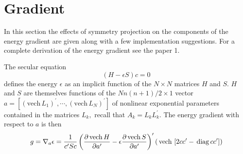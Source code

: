 \documentclass[12pt,thmsa]{article}
\begin{document}
\section{Gradient}

In this section the effects of symmetry projection on the components of the
energy gradient are given along with a few implementation suggestions. For a
complete derivation of the energy gradient see the paper 1.

The secular equation 
\begin{equation}
\left( H-\epsilon S\right) c=0
\end{equation}
defines the energy $\epsilon $ as an implicit function of the $N\times N$
matrices $H$ and $S$. $H$ and $S$ are themselves functions of the $Nn\left(
n+1\right) /2\times 1$ vector $a=\left[ \left( \mathrm{vech}\,L_1\right)
^{\prime },\cdots ,\left( \mathrm{vech}\,L_N\right) ^{\prime }\right] $ of
nonlinear exponential parameters contained in the matrices $L_k,$ recall
that $A_k=L_kL_k^{\prime }$. The energy gradient with respect to $a$ is then 
\begin{equation}
g=\nabla _a\epsilon =\frac 1{c^{\prime }Sc}\left( \frac{\partial \,\mathrm{%
vech}\,H}{\partial a^{\prime }}-\epsilon \frac{\partial \,\mathrm{vech}\,S}{%
\partial a^{\prime }}\right) ^{\prime }\left( \,\mathrm{vech}\,\left[
2cc^{\prime }-\,\mathrm{diag}\,cc^{\prime }\right] \right)  \label{grad}
\end{equation}
\end{document}

